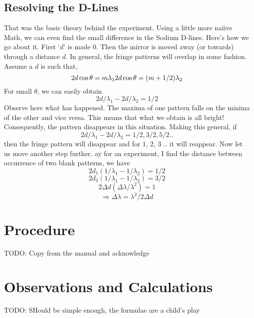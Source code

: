 	\subsection{Resolving the D-Lines}
		That was the basic theory behind the experiment. Using a little more naiive Math, we can even find the small difference in the Sodium D-lines. Here's how we go about it. First `$d$' is made 0. Then the mirror is moved away (or towards) through a distance $d$. In general, the fringe patterns will overlap in some fashion. Assume a $d$ is such that,
		\begin{equation}
			2d\cos{\theta}=m\lambda_1 \\
			2d\cos{\theta}=(m+1/2)\lambda_2
		\end{equation}
		For small $\theta$, we can easily obtain
		\begin{equation}
			2d/\lambda_1 - 2d/\lambda_2 = 1/2
		\end{equation}
		Observe here what has happened. The maxima of one pattern falls on the minima of the other and vice versa. This means that what we obtain is all bright! Consequently, the pattern disappears in this situation. Making this general, if
		\begin{equation}
			2d/\lambda_1 - 2d/\lambda_2 = 1/2, 3/2, 5/2 ..
		\end{equation}
		then the fringe pattern will disappear and for 1, 2, 3 .. it will reappear. Now let us move another step further. ay for an experiment, I find the distance between occurrence of two blank patterns, we have
		\begin{equation}
			2d_1 (1/\lambda_1 - 1/\lambda_2) = 1/2
		\end{equation}
		\begin{equation}
			2d_2 (1/\lambda_1 - 1/\lambda_2) = 3/2
		\end{equation}
		\begin{equation}
			2\Delta d (\Delta \lambda / \lambda^2) = 1
		\end{equation}
		\begin{equation}
			\Rightarrow \Delta \lambda = \lambda^2/2\Delta d
		\end{equation}

\section{Procedure}
	TODO: Copy from the manual and acknowledge

\section{Observations and Calculations}	
	TODO: SHould be simple enough, the formulae are a child's play

